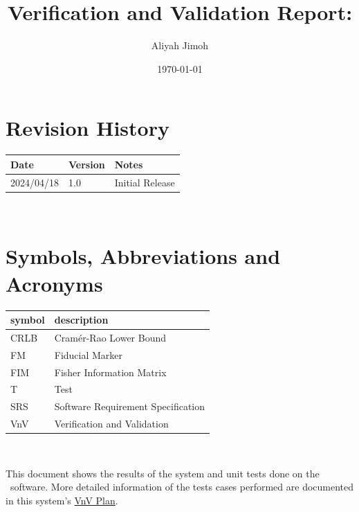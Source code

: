 \documentclass[12pt, titlepage]{article}
\begin{document}
\title{Verification and Validation Report: \progname} 
\author{Aliyah Jimoh}
\date{\today}
	
\maketitle


\section{Revision History}

\begin{tabularx}{\textwidth}{p{3cm}p{2cm}X}
\toprule {\bf Date} & {\bf Version} & {\bf Notes}\\
\midrule
2024/04/18 & 1.0 & Initial Release\\
\bottomrule
\end{tabularx}

~\newpage

\section{Symbols, Abbreviations and Acronyms}

\renewcommand{\arraystretch}{1.2}
\begin{tabular}{l l} 
  \toprule		
  \textbf{symbol} & \textbf{description}\\
  \midrule 
  CRLB & Cram\'er-Rao Lower Bound\\
  FM & Fiducial Marker\\
  FIM & Fisher Information Matrix\\
  T & Test\\
  SRS & Software Requirement Specification\\
  VnV & Verification and Validation\\
  \bottomrule
\end{tabular}\\

\newpage

\tableofcontents

\listoftables %

\listoffigures %

\newpage


This document shows the results of the system and unit tests done on the \progname~software. More detailed information of the tests cases performed are documented in this system's \href{https://github.com/AliyahJimoh/2D-Localizer/blob/main/docs/VnVPlan/VnVPlan.pdf}{VnV Plan}.
\end{document}
